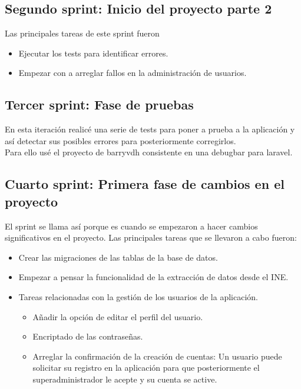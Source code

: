 \subsection{Segundo sprint: Inicio del proyecto parte 2}
Las principales tareas de este sprint fueron 
\begin{itemize}
    \item Ejecutar los tests para identificar errores.
    \item Empezar con a arreglar fallos en la administración de usuarios.
\end{itemize}
\subsection{Tercer sprint: Fase de pruebas}
En esta iteración realicé una serie de tests para poner a prueba a la aplicación y así detectar sus posibles errores para posteriormente corregirlos.\\
Para ello usé el proyecto de barryvdh consistente en una debugbar para laravel.\\
\subsection{Cuarto sprint:  Primera fase de cambios en el proyecto}
El sprint se llama así porque es cuando se empezaron a hacer cambios significativos en el proyecto.
Las principales tareas que se llevaron a cabo fueron:
\begin{itemize}
    \item Crear las migraciones de las tablas de la base de datos.
    \item Empezar a pensar la funcionalidad de la extracción de datos desde el INE.
    \item Tareas relacionadas con la gestión de los usuarios de la aplicación.
    \begin{itemize}
        \item Añadir la opción de editar el perfil del usuario.
        \item Encriptado de las contraseñas.
        \item Arreglar la confirmación de la creación de cuentas: Un usuario puede solicitar su registro en la aplicación para que posteriormente el superadministrador le acepte y su cuenta se active.
    \end{itemize}
\end{itemize}
